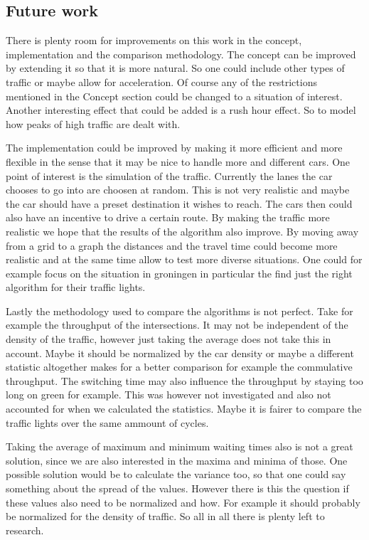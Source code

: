\documentclass[a4paper,11pt]{article}
\begin{document}
\subsection{Future work}

There is plenty room for improvements on this work in the concept, implementation and the comparison methodology.
The concept can be improved by extending it so that it is more natural.
So one could include other types of traffic or maybe allow for acceleration.
Of course any of the restrictions mentioned in the Concept section could be changed to a situation of interest.
Another interesting effect that could be added is a rush hour effect.
So to model how peaks of high traffic are dealt with.

The implementation could be improved by making it more efficient and more flexible in the sense that it may be nice to handle more and different cars.
One point of interest is the simulation of the traffic.
Currently the lanes the car chooses to go into are choosen at random.
This is not very realistic and maybe the car should have a preset destination it wishes to reach.
The cars then could also have an incentive to drive a certain route.
By making the traffic more realistic we hope that the results of the algorithm also improve.
By moving away from a grid to a graph the distances and the travel time could become more realistic and at the same time allow to test more diverse situations.
One could for example focus on the situation in groningen in particular the find just the right algorithm for their traffic lights.

Lastly the methodology used to compare the algorithms is not perfect.
Take for example the throughput of the intersections.
It may not be independent of the density of the traffic, however just taking the average does not take this in account.
Maybe it should be normalized by the car density or maybe a different statistic altogether makes for a better comparison for example the commulative throughput.
The switching time may also influence the throughput by staying too long on green for example.
This was however not investigated and also not accounted for when we calculated the statistics.
Maybe it is fairer to compare the traffic lights over the same ammount of cycles.

Taking the average of maximum and minimum waiting times also is not a great solution, since we are also interested in the maxima and minima of those.
One possible solution would be to calculate the variance too, so that one could say something about the spread of the values.
However there is this the question if these values also need to be normalized and how.
For example it should probably be normalized for the density of traffic.
So all in all there is plenty left to research.
\end{document}
